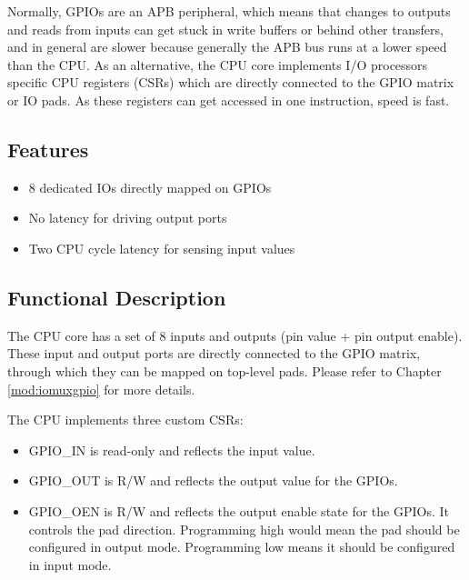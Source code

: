 \documentclass[main\_\_EN.tex]{subfiles}
\begin{document}
Normally, GPIOs are an APB peripheral, which means that changes to outputs and reads from inputs can get stuck in write buffers or behind other transfers, and in general are slower because generally the APB bus runs at a lower speed than the CPU.
As an alternative, the CPU core implements I/O processors specific CPU registers (CSRs) which are directly connected to the GPIO matrix or IO pads. As these registers can get accessed in one instruction, speed is fast.

\subsection{Features}
\label{sec:riscvcpu-fastio-features}
 \begin{itemize}
    \item 8 dedicated IOs directly mapped on GPIOs
    \item No latency for driving output ports
    \item Two CPU cycle latency for sensing input values
\end{itemize}

\subsection{Functional Description}
\label{sec:riscvcpu-fastio-func-descr}

The CPU core has a set of 8 inputs and outputs (pin value + pin output enable). These input and output ports are directly connected to the GPIO matrix, through which they can be mapped on top-level pads. Please refer to Chapter \ref{mod:iomuxgpio} \textit{} for more details.

The CPU implements three custom CSRs:
\begin{itemize}
    \item GPIO\_IN is read-only and reflects the input value.
    \item GPIO\_OUT is R/W and reflects the output value for the GPIOs.
    \item GPIO\_OEN is R/W and reflects the output enable state for the GPIOs. It controls the pad direction. Programming high would mean the pad should be configured in output mode. Programming low means it should be configured in input mode.
\end{itemize}


\clearpage
\hypertarget{riscvcpu-fastio-reg-summ}{}
\end{document}
